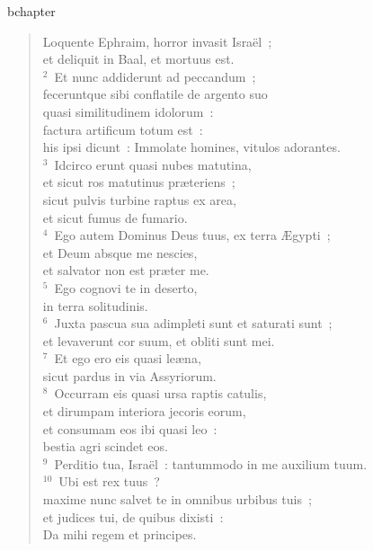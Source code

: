 bchapter\begin{flushleft}\begin{verse}\vspace{-19pt}\hspace{6pt}Loquente Ephraim, horror invasit Isra\"el~;\\\hspace{6pt} et deliquit in Baal, et mortuus est.\\
${}^{2}$~Et nunc addiderunt ad peccandum~;\\ feceruntque sibi conflatile de argento suo\\ quasi similitudinem idolorum~:\\ factura artificum totum est~:\\ his ipsi dicunt~: Immolate homines, vitulos adorantes.\\
${}^{3}$~Idcirco erunt quasi nubes matutina,\\ et sicut ros matutinus pr\ae teriens~;\\ sicut pulvis turbine raptus ex area,\\ et sicut fumus de fumario.\\
${}^{4}$~Ego autem Dominus Deus tuus, ex terra \AE gypti~;\\ et Deum absque me nescies,\\ et salvator non est pr\ae ter me.\\
${}^{5}$~Ego cognovi te in deserto,\\ in terra solitudinis.\\
${}^{6}$~Juxta pascua sua adimpleti sunt et saturati sunt~;\\ et levaverunt cor suum, et obliti sunt mei.\\
${}^{7}$~Et ego ero eis quasi le\ae na,\\ sicut pardus in via Assyriorum.\\
${}^{8}$~Occurram eis quasi ursa raptis catulis,\\ et dirumpam interiora jecoris eorum,\\ et consumam eos ibi quasi leo~:\\ bestia agri scindet eos.\\
${}^{9}$~Perditio tua, Isra\"el~: tantummodo in me auxilium tuum.\\
${}^{10}$~Ubi est rex tuus~?\\ maxime nunc salvet te in omnibus urbibus tuis~;\\ et judices tui, de quibus dixisti~:\\ Da mihi regem et principes.\\

\end{verse}
\end{flushleft}
